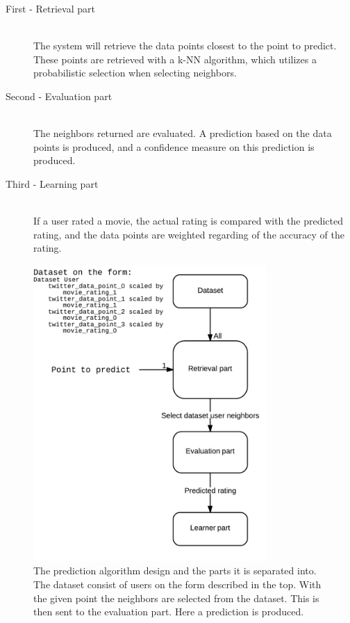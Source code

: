 \begin{description}
    \item[First - Retrieval part] \hfill \\
    The system will retrieve the data points closest to the point to predict. These points are retrieved with a k-NN algorithm, which utilizes a probabilistic selection when selecting neighbors.

    \item[Second - Evaluation part] \hfill \\
    The neighbors returned are evaluated. A prediction based on the data points is produced, and a confidence measure on this prediction is produced.

    \item[Third - Learning part] \hfill \\
    If a user rated a movie, the actual rating is compared with the predicted rating, and the data points are weighted regarding of the accuracy of the rating.
\end{description}

\begin{figure}[H]
\centerline{\includegraphics[width=3.5in]{image/pred-alg.png}}
\caption[Prediction algorithm]{The prediction algorithm design and the parts it is separated into. The dataset consist of users on the form described in the top. With the given point the neighbors are selected from the dataset. This is then sent to the evaluation part. Here a prediction is produced.}
\label{figure:pred-alg}
\end{figure}
